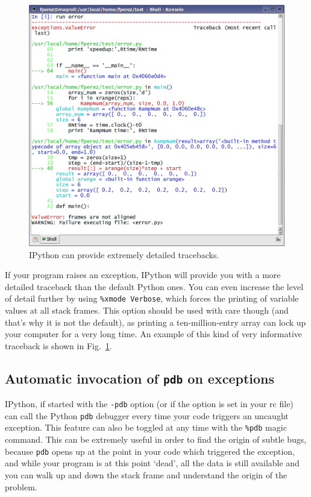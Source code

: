 %
\begin{figure}
\begin{centering}
\includegraphics[width=0.7\linewidth]{fig/ipscr_traceback}
\par\end{centering}

\caption{\label{fig:ipscr_traceback}IPython can provide extremely detailed
tracebacks.}

\end{figure}


If your program raises an exception, IPython will provide you with
a more detailed traceback than the default Python ones. You can even
increase the level of detail further by using \texttt{\%xmode Verbose},
which forces the printing of variable values at all stack frames.
This option should be used with care though (and that's why it is
not the default), as printing a ten-million-entry array can lock up
your computer for a very long time. An example of this kind of very
informative traceback is shown in Fig.~\ref{fig:ipscr_traceback}.


\subsection{Automatic invocation of \texttt{pdb} on exceptions}

IPython, if started with the \texttt{-pdb} option (or if the option
is set in your rc file) can call the Python \texttt{pdb} debugger
every time your code triggers an uncaught exception. This feature
can also be toggled at any time with the \texttt{\%pdb} magic command.
This can be extremely useful in order to find the origin of subtle
bugs, because \texttt{pdb} opens up at the point in your code which
triggered the exception, and while your program is at this point `dead',
all the data is still available and you can walk up and down the stack
frame and understand the origin of the problem.

